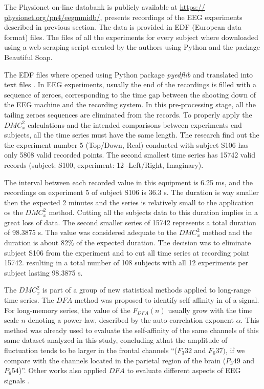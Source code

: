 \documentclass[10pt,letterpaper]{article}
\newcommand{\dmc}{\(DMC_x^2\) }
\begin{document}
The Physionet on-line databank is publicly available at \url{https:// physionet.org/pn4/eegmmidb/}, presents recordings of the EEG experiments described in previous section. The data is  provided in EDF (European data format) files. The files of all the experiments for every subject where downloaded using a web scraping script created by the authors using Python and the package Beautiful Soap.

The EDF files where opened using Python package \emph{pyedflib} and translated into text files . In EEG experiments, usually the end of the recordings is filled with a sequence of zeroes, corresponding to the time gap between the shooting down of the EEG machine and the recording system. In this pre-processing stage, all the tailing zeroes sequences are eliminated from the records. To properly apply the \dmc calculations and the intended comparisons between experiments end subjects, all the time series must have the same length. The research find out the the	experiment number 5	(Top/Down, Real) conducted with subject S106 has only 5808 valid recorded points. The second smallest time series has 15742 valid records (subject: S100, experiment: 12	-Left/Right,	Imaginary).

The interval between each recorded value in this equipment is 6.25 ms, and the recordings on experiment 5 of subject S106 is 36.3 s. The duration is way smaller then the expected 2 minutes and the series is relatively small to the application os the \dmc method. Cutting all the subjects data to this duration implies in a great loss of data. The second smaller series of 15742 represents a total duration of 98.3875 s. The value was considered adequate to the \dmc method and the duration is about 82\% of the expected duration. The decision was to eliminate subject S106 from the experiment and to cut all time series at recording point 15742. resulting in a total number of 108 subjects with all 12 experiments per subject lasting 98.3875 s.


The \dmc is part of a group of new statistical methods applied to long-range time series. The \(DFA\) method \cite{Peng1994, Buldyrev1950} was proposed to identify self-affinity in of a signal. For long-memory series, the value of the \(F_{DFA}(n)\) usually grow with the time scale \(n\) denoting a power-law, described by the auto-correlation exponent \(\alpha\). This method was already used to evaluate the self-affinity of the same channels of this same dataset analyzed in this study, concluding xthat the amplitude of fluctuation tends to be larger in the frontal channels ``(\(F_{3}32\) and \(F_{6}37)\), if we compare with the channels located in the parietal region of the brain (\(P_{3}49\) and \(P_{6}54\))''\cite{Zebende2017}. Other works also applied \(DFA\) to evaluate different aspects of EEG signals \cite{Mesquita2019} \cite{OliveiraFilho2019} \cite{OliveiraFilho2021}.
\end{document}
